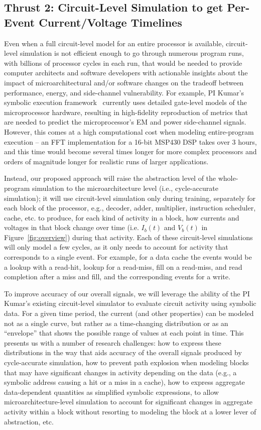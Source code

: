\subsection{Thrust 2: Circuit-Level Simulation to get Per-Event Current/Voltage Timelines}

Even when a full circuit-level model for an entire processor is available, circuit-level simulation is not efficient enough to go through numerous program runs, with billions of processor cycles in each run, that would be needed to provide computer architects and software developers with actionable insights about the impact of microarchitectural and/or software changes on the tradeoff between performance, energy, and side-channel vulnerability. For example, PI Kumar's symbolic execution framework~\cite{cherupalli2017} currently uses detailed gate-level models of the microprocessor hardware, resulting in high-fidelity reproduction of metrics that are needed to predict the microprocessor's EM and power side-channel signals. However, this comes at a high computational cost when modeling entire-program execution -- an FFT implementation for a 16-bit MSP430 DSP takes over 3 hours, and this time would become several times longer for more complex processors and orders of magnitude longer for realistic runs of larger applications.

Instead, our proposed approach will raise the abstraction level of the whole-program simulation to the microarchitecture level (i.e., cycle-accurate simulation); it will use circuit-level simulation only during training, separately for each block of the processor, e.g., decoder, adder, multiplier, instruction scheduler, cache, etc. to produce, for each kind of activity in a block, how currents and voltages in that block change over time (i.e. $I_b(t)$ and $V_b(t)$ in Figure~\ref{fig:overview}) during that activity. Each of these circuit-level simulations will only model a few cycles, as it only needs to account for activity that corresponds to a single event. For example, for a data cache the events would be a lookup with a read-hit, lookup for a read-miss, fill on a read-miss, and read completion after a miss and fill, and the corresponding events for a write.

To improve accuracy of our overall signals, we will leverage the ability of the PI Kumar's existing circuit-level simulator to evaluate circuit activity using symbolic data. For a given time period, the current (and other properties) can be modeled not as a single curve, but rather as a time-changing distribution or as an  ``envelope'' that shows the possible range of values at each point in time. This presents us with a number of research challenges: how to express these distributions in the way that aids accuracy of the overall signals produced by cycle-accurate simulation, how to prevent path explosion when modeling blocks that may have significant changes in activity depending on the data (e.g., a symbolic address causing a hit or a miss in a cache), how to express aggregate data-dependent quantities as simplified symbolic expressions, to allow microarchitecture-level simulation to account for significant changes in aggregate activity within a block without resorting to modeling the block at a lower lever of abstraction, etc.

